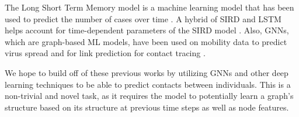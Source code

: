 \documentclass[times, 10pt,twocolumn]{article}
\begin{document}
The Long Short Term Memory model is a machine learning model that has been used to predict the number of cases over time \cite{SEIRD-LSTM}. A hybrid of SIRD and LSTM helps account for time-dependent parameters of the SIRD model \cite{SIRD-LSTM-hybrid}. Also, GNNs, which are graph-based ML models, have been used on mobility data to predict virus spread and for link prediction for contact tracing \cite{positivity-hospitalization-GNN}\cite{contact-tracing-GNN}.

We hope to build off of these previous works by utilizing GNNs and other deep learning techniques to be able to predict contacts between individuals. This is a non-trivial and novel task, as it requires the model to potentially learn a graph's structure based on its structure at previous time steps as well as node features.






\end{document}
